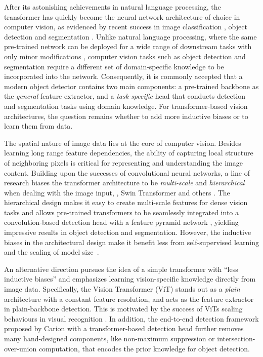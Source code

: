 After its astonishing achievements in natural language processing, the transformer \citep{vaswani2017transformer} has quickly become the neural network architecture of choice in computer vision, as evidenced by recent success in image classification \citep{liu2021swintransformer,dosovitskiy2021vit}, object detection \citep{nicolas2020detr,zhu2021deformable,nguyen2022boxer} and segmentation \citep{wang2021maxdeeplab,zhang2021knet,cheng2022mask2former}. Unlike natural language processing, where the same pre-trained network can be deployed for a wide range of downstream tasks with only minor modifications \citep{brown2020gpt3,devlin2019bert}, computer vision tasks such as object detection and segmentation require a different set of domain-specific knowledge to be incorporated into the network. Consequently, it is commonly accepted that a modern object detector contains two main components: a pre-trained backbone as the \emph{general} feature extractor, and a \emph{task-specific} head that conducts detection and segmentation tasks using domain knowledge. For transformer-based vision architectures, the question remains whether to add more inductive biases or to learn them from data.

The spatial nature of image data lies at the core of computer vision. Besides learning long range feature dependencies, the ability of capturing local structure of neighboring pixels is critical for representing and understanding the image content. Building upon the successes of convolutional neural networks, a line of research biases the transformer architecture to be \emph{multi-scale} and \emph{hierarchical} when dealing with the image input, \ie, Swin Transformer \cite{liu2021swintransformer} and others \citep{fan2021mvit,wang2021pvit,heo2021rethinkingvit}.
The hierarchical design makes it easy to create multi-scale features for dense vision tasks and allows pre-trained transformers to be seamlessly integrated into a convolution-based detection head with a feature pyramid network \citep{tsung2017fpn}, yielding impressive results in object detection and segmentation. However, the inductive biases in the architectural design make it benefit less from self-supervised learning and the scaling of model size~\citep{li2022vitdet}.

An alternative direction pursues the idea of a simple transformer with ``less inductive biases'' and emphasizes learning vision-specific knowledge directly from image data. 
Specifically, the Vision Transformer (ViT) \citep{dosovitskiy2021vit} stands out as a \emph{plain} architecture with a constant feature resolution, and acts as the feature extractor in plain-backbone detection. This is motivated by the success of ViTs scaling behaviours in visual recognition \citep{he2022mae,bao2022beit,dehghani2023scalingvit22b}. In addition, the end-to-end detection framework proposed by Carion \etal \cite{nicolas2020detr} with a transformer-based detection head further removes many hand-designed components, like non-maximum suppression or intersection-over-union computation, that encodes the prior knowledge for object detection. 

